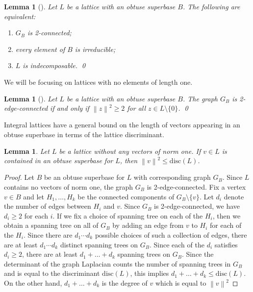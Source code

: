 \documentclass{amsart} %
\newcommand{\norm}[1]{\left\lVert #1 \right\rVert^2}
\theoremstyle{thm}
\newtheorem{lem}[Theorem]{Lemma}
\theoremstyle{definition}
\numberwithin{equation}{section}
\begin{document}
\begin{lem}[{\cite[Lemma~2.3]{McCoyAltUnknotting}}]\label{lem:2-connected}
Let $L$ be a lattice with an obtuse superbase $B$. The following are equivalent:
\begin{enumerate}
    \item $G_B$ is 2-connected;
    \item every element of $B$ is irreducible;
    \item $L$ is indecomposable. \qed
\end{enumerate}
\end{lem}
We will be focusing on lattices with no elements of length one. 
\begin{lem}[{\cite[Lemma~2.4]{McCoyAltUnknotting}}]
Let $L$ be a lattice with an obtuse superbase $B$. The graph $G_B$ is 2-edge-connected if and only if $\norm{z}\geq 2$ for all $z\in L\setminus\{0\}$. \qed
\end{lem}

Integral lattices have a general bound on the length of vectors appearing in an obtuse superbase in terms of the lattice discriminant.
\begin{lem}\label{lem:universal_bound}
Let $L$ be a lattice without any vectors of norm one. If $v\in L$ is contained in an obtuse superbase for $L$, then $\norm{v}\leq \mathrm{disc}(L)$.
\end{lem}
\begin{proof}
Let $B$ be an obtuse superbase for $L$ with corresponding graph $G_B$. Since $L$ contains no vectors of norm one, the graph $G_B$ is 2-edge-connected. Fix a vertex $v\in B$ and let $H_1, \dots, H_k$ be the connected components of $G_B\setminus \{v\}$. Let $d_i$ denote the number of edges between $H_i$ and $v$. Since $G_B$ is 2-edge-connected, we have $d_i\geq 2$ for each $i$. 
If we fix a choice of spanning tree on each of the $H_i$, then we obtain a spanning tree on all of $G_B$ by adding an edge from $v$ to $H_i$ for each of the $H_i$. Since there are $d_1 \cdots d_k$ possible choices of such a collection of edges, there are at least $d_1 \cdots d_k$ distinct spanning trees on $G_B$. Since each of the $d_i$ satisfies $d_i\geq 2$, there are at least $d_1 + \dots + d_k$ spanning trees on $G_B$. Since the determinant of the graph Laplacian counts the number of spanning trees in $G_B$ and is equal to the discriminant $\mathrm{disc}(L)$, this implies $d_1 + \dots + d_k \leq \mathrm{disc}(L)$. On the other hand, $d_1 + \dots + d_k$ is the degree of $v$ which is equal to $\norm{v}$
\end{proof}
\end{document}

